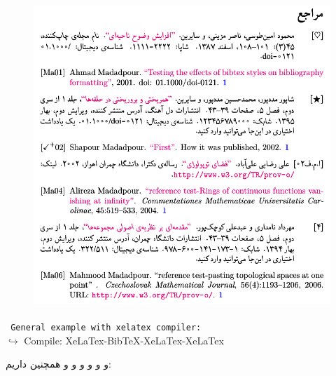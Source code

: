 \documentclass{article}
\begin{document}
\begin{figure}[H]
\centering
\includegraphics[width=\textwidth,height=11.5cm]{image/sh12}
\end{figure}





\noindent
\begin{latin}
{\tt{\color{blue} General example with xelatex compiler:}}\\
{\color{blue}$\hookrightarrow$ Compile: XeLaTex-BibTeX-XeLaTex-XeLaTex}
\end{latin}
 و
\cite{d}
و
\cite{Amintoosi87afzayesh}
و
و
و
\cite{aliabad2004rings,ali,whatever,B02f,d}
و همچنین داریم:
\end{document}
